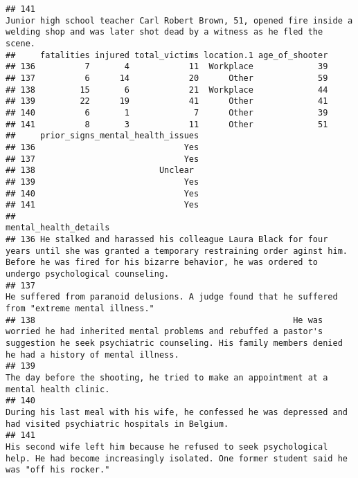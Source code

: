 \documentclass[
]{article}
\begin{document}
\begin{verbatim}
## 141                                                                                                                                                                                                                                               Junior high school teacher Carl Robert Brown, 51, opened fire inside a welding shop and was later shot dead by a witness as he fled the scene.
##     fatalities injured total_victims location.1 age_of_shooter
## 136          7       4            11  Workplace             39
## 137          6      14            20      Other             59
## 138         15       6            21  Workplace             44
## 139         22      19            41      Other             41
## 140          6       1             7      Other             39
## 141          8       3            11      Other             51
##     prior_signs_mental_health_issues
## 136                              Yes
## 137                              Yes
## 138                         Unclear 
## 139                              Yes
## 140                              Yes
## 141                              Yes
##                                                                                                                                                                                                                   mental_health_details
## 136 He stalked and harassed his colleague Laura Black for four years until she was granted a temporary restraining order aginst him. Before he was fired for his bizarre behavior, he was ordered to undergo psychological counseling. 
## 137                                                                                                                                  He suffered from paranoid delusions. A judge found that he suffered from "extreme mental illness."
## 138                                                    He was worried he had inherited mental problems and rebuffed a pastor's suggestion he seek psychiatric counseling. His family members denied he had a history of mental illness.
## 139                                                                                                                                            The day before the shooting, he tried to make an appointment at a mental health clinic. 
## 140                                                                                                                 During his last meal with his wife, he confessed he was depressed and had visited psychiatric hospitals in Belgium.
## 141                                                                       His second wife left him because he refused to seek psychological help. He had become increasingly isolated. One former student said he was "off his rocker."

\end{verbatim}
\end{document}
